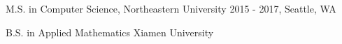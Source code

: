 


\begin{cventries}




	\verycompactcventry
	{M.S. in Computer Science, Northeastern University} %
	{2015 - 2017, Seattle, WA} %

	\verycompactcventry
	{B.S. in Applied Mathematics} %
	{Xiamen University} %

\end{cventries}